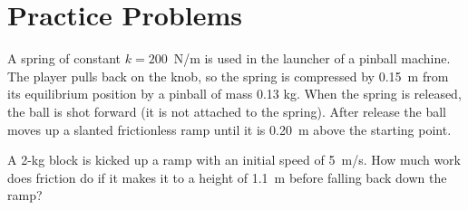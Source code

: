 \documentclass[10pt]{exam}
\begin{document}
\section*{Practice Problems}

\begin{questions}
  \question

  A spring of constant $k= 200$~N/m is used in the launcher of a pinball machine. The player pulls back on the knob, so the spring is compressed by 0.15~m from its equilibrium position by a pinball of mass 0.13 kg. When the spring is released, the ball is shot forward (it is not attached to the spring). After release the ball moves up a slanted frictionless ramp until it is 0.20~m above the starting point.


  \vs[2]

\question
  A 2-kg block is kicked up a ramp with an initial speed of 5~m/s.  How much work does friction do if it makes it to a height of 1.1~m before falling back down the ramp?

\vs[1]


      

\end{questions}
\end{document}
